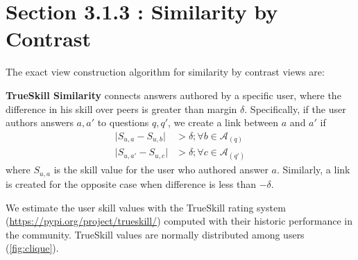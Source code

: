 \documentclass[smallcondensed]{svjour3}     %
\begin{document}
\section{Section 3.1.3 : Similarity by Contrast}
The exact view construction algorithm for similarity by contrast views are:

\textbf{TrueSkill Similarity} connects answers authored by a specific user, where the difference in his skill over peers is greater than margin $\delta$. Specifically, if the user authors answers $a, a'$ to questions $q, q'$, we create a link between $a$ and $a'$ if %
\begin{align*}
 \lvert S_{u,a} - S_{u, b} \rvert &> \delta; \forall b \in \mathcal{A}_(q) \\
 \lvert S_{u,a'} - S_{u, c} \rvert &> \delta; \forall c \in \mathcal{A}_(q')
\end{align*}
where $S_{u,a}$ is the skill value for the user who authored answer $a$. Similarly, a link is created for the opposite case when difference is less than $-\delta$.

We estimate the user skill values with the TrueSkill rating system (\url{https://pypi.org/project/trueskill/}) computed with their historic performance in the community. TrueSkill values are normally distributed among users (\cref{fig:clique}).

\end{document}
